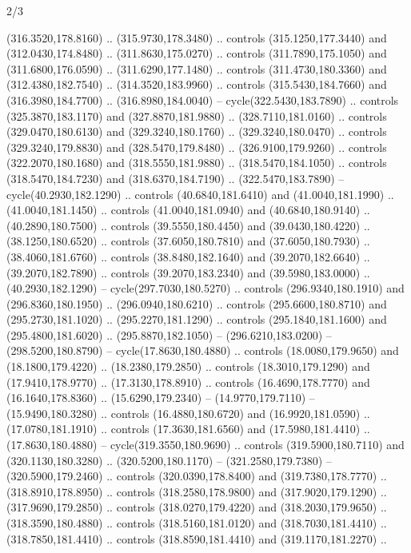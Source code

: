 \begin{flagdescription}{2/3}
\begin{scope}[xshift=0.5\flaglength,yshift=0.5\flagwidth,scale=\stretchfactor]
\begin{scope}[scale=0.001645\flagwidth,yshift=65mm,xshift=-63mm]
\begin{scope}[y=0.80pt, x=0.80pt, yscale=-1,]
\begin{scope}[cm={{1.33333,0.0,0.0,1.33333,(0.0,1e-05)}}]
  (316.3520,178.8160) .. (315.9730,178.3480) .. controls (315.1250,177.3440) and
  (312.0430,174.8480) .. (311.8630,175.0270) .. controls (311.7890,175.1050) and
  (311.6800,176.0590) .. (311.6290,177.1480) .. controls (311.4730,180.3360) and
  (312.4380,182.7540) .. (314.3520,183.9960) .. controls (315.5430,184.7660) and
  (316.3980,184.7700) .. (316.8980,184.0040) -- cycle(322.5430,183.7890) ..
  controls (325.3870,183.1170) and (327.8870,181.9880) .. (328.7110,181.0160) ..
  controls (329.0470,180.6130) and (329.3240,180.1760) .. (329.3240,180.0470) ..
  controls (329.3240,179.8830) and (328.5470,179.8480) .. (326.9100,179.9260) ..
  controls (322.2070,180.1680) and (318.5550,181.9880) .. (318.5470,184.1050) ..
  controls (318.5470,184.7230) and (318.6370,184.7190) .. (322.5470,183.7890) --
  cycle(40.2930,182.1290) .. controls (40.6840,181.6410) and (41.0040,181.1990)
  .. (41.0040,181.1450) .. controls (41.0040,181.0940) and (40.6840,180.9140) ..
  (40.2890,180.7500) .. controls (39.5550,180.4450) and (39.0430,180.4220) ..
  (38.1250,180.6520) .. controls (37.6050,180.7810) and (37.6050,180.7930) ..
  (38.4060,181.6760) .. controls (38.8480,182.1640) and (39.2070,182.6640) ..
  (39.2070,182.7890) .. controls (39.2070,183.2340) and (39.5980,183.0000) ..
  (40.2930,182.1290) -- cycle(297.7030,180.5270) .. controls (296.9340,180.1910)
  and (296.8360,180.1950) .. (296.0940,180.6210) .. controls (295.6600,180.8710)
  and (295.2730,181.1020) .. (295.2270,181.1290) .. controls (295.1840,181.1600)
  and (295.4800,181.6020) .. (295.8870,182.1050) -- (296.6210,183.0200) --
  (298.5200,180.8790) -- cycle(17.8630,180.4880) .. controls (18.0080,179.9650)
  and (18.1800,179.4220) .. (18.2380,179.2850) .. controls (18.3010,179.1290)
  and (17.9410,178.9770) .. (17.3130,178.8910) .. controls (16.4690,178.7770)
  and (16.1640,178.8360) .. (15.6290,179.2340) -- (14.9770,179.7110) --
  (15.9490,180.3280) .. controls (16.4880,180.6720) and (16.9920,181.0590) ..
  (17.0780,181.1910) .. controls (17.3630,181.6560) and (17.5980,181.4410) ..
  (17.8630,180.4880) -- cycle(319.3550,180.9690) .. controls (319.5900,180.7110)
  and (320.1130,180.3280) .. (320.5200,180.1170) -- (321.2580,179.7380) --
  (320.5900,179.2460) .. controls (320.0390,178.8400) and (319.7380,178.7770) ..
  (318.8910,178.8950) .. controls (318.2580,178.9800) and (317.9020,179.1290) ..
  (317.9690,179.2850) .. controls (318.0270,179.4220) and (318.2030,179.9650) ..
  (318.3590,180.4880) .. controls (318.5160,181.0120) and (318.7030,181.4410) ..
  (318.7850,181.4410) .. controls (318.8590,181.4410) and (319.1170,181.2270) ..

\end{scope}
\end{scope}
\end{scope}
\end{scope}
\end{flagdescription}
